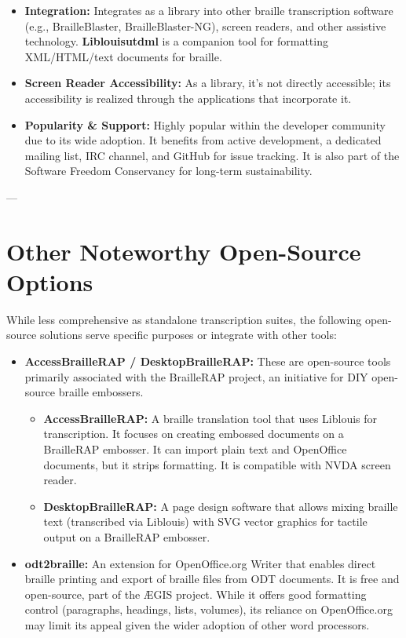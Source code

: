 \begin{itemize}
\begin{itemize}
        \item \textbf{Integration:} Integrates as a library into other braille transcription software (e.g., BrailleBlaster, BrailleBlaster-NG), screen readers, and other assistive technology. \textbf{Liblouisutdml} is a companion tool for formatting XML/HTML/text documents for braille.
        \item \textbf{Screen Reader Accessibility:} As a library, it's not directly accessible; its accessibility is realized through the applications that incorporate it.
        \item \textbf{Popularity & Support:} Highly popular within the developer community due to its wide adoption. It benefits from active development, a dedicated mailing list, IRC channel, and GitHub for issue tracking. It is also part of the Software Freedom Conservancy for long-term sustainability.
    \end{itemize}
\end{itemize}

---

\section{Other Noteworthy Open-Source Options}
\label{sec:braille-other-open-source}
While less comprehensive as standalone transcription suites, the following open-source solutions serve specific purposes or integrate with other tools:

\begin{itemize}
    \item \textbf{AccessBrailleRAP / DesktopBrailleRAP:} These are open-source tools primarily associated with the BrailleRAP project, an initiative for DIY open-source braille embossers.
    \begin{itemize}
        \item \textbf{AccessBrailleRAP:} A braille translation tool that uses Liblouis for transcription. It focuses on creating embossed documents on a BrailleRAP embosser. It can import plain text and OpenOffice documents, but it strips formatting. It is compatible with NVDA screen reader\footnotemark{}.
        \item \textbf{DesktopBrailleRAP:} A page design software that allows mixing braille text (transcribed via Liblouis) with SVG vector graphics for tactile output on a BrailleRAP embosser\footnotemark{}.
    \end{itemize}
    \item \textbf{odt2braille:} An extension for OpenOffice.org Writer that enables direct braille printing and export of braille files from ODT documents. It is free and open-source, part of the ÆGIS project. While it offers good formatting control (paragraphs, headings, lists, volumes), its reliance on OpenOffice.org may limit its appeal given the wider adoption of other word processors\footnotemark{}.
\end{itemize}

